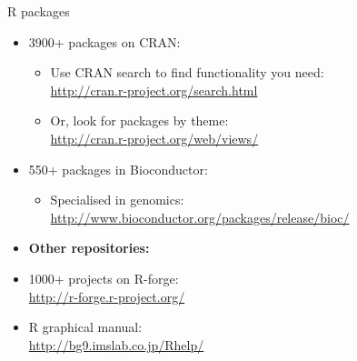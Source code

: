 \documentclass{beamer}
\begin{document}
\begin{frame}{R packages}
    \begin{itemize}
        \item 3900+ packages on CRAN:
        \begin{itemize}
            \item Use CRAN search to find functionality you need:\\
            \url{http://cran.r-project.org/search.html}
            \item Or, look for packages by theme:\\
            \url{http://cran.r-project.org/web/views/}
        \end{itemize}
        \item 550+ packages in Bioconductor:
        \begin{itemize}
            \item Specialised in genomics:\\
            \url{http://www.bioconductor.org/packages/release/bioc/}
        \end{itemize}
        \item \textbf{Other repositories:}
        \item 1000+ projects on R-forge:\\
        \url{http://r-forge.r-project.org/}
        \item R graphical manual:\\
        \url{http://bg9.imslab.co.jp/Rhelp/}
    \end{itemize}
\end{frame}
\end{document}
